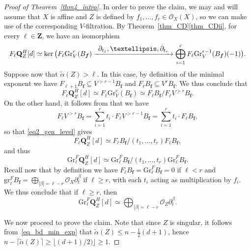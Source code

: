 \documentclass[11pt]{article}
\numberwithin{equation}{section}
\newcommand{\To}[1]{\mathchoice{\xrightarrow{\textstyle\kern4pt#1\kern3pt}}{\stackrel{#1}{\longrightarrow}}{}{}}
\theoremstyle{plain}
\theoremstyle{definition}
\newcommand\Z{{\mathbf Z}}
\newcommand\Q{{\mathbf Q}}
\newcommand\cO{\mathcal{O}}
\newcommand\cO{\mathcal{O}}
\newcommand\bff{{\boldsymbol f}}
\newcommand\gr{\mathrm{Gr}}
\begin{document}
\begin{proof}[Proof of Theorem~\ref{thm4_intro}]
In order to prove the claim, we may and will assume that $X$ is affine and $Z$ is defined by $f_1,\ldots,f_r\in\cO_X(X)$, so we can make use
of the corresponding $V$-filtration. By Theorem~\ref{thm_CD}\eqref{thm_CDii}, for every $\ell\in\Z$, we have an isomorphism\vspace*{-3pt}
\[F_{\ell}\Q^H_Z[d]\simeq \ker\big(F_{\ell}\gr_V^r(B_{\bff})\To{\partial_{t_1},\ldots,\partial_{t_r}}
\bigoplus_{i=1}^rF_{\ell}\gr_V^{r-1}(B_{\bff})(-1)\big).\]
Suppose now that $\widetilde{\alpha}(Z)>\ell$. In this case, by definition of the minimal exponent we have
$F_{\ell+1}B_{\bff}\subseteq V^{>r-1}B_{\bff}$ and $F_{\ell}B_{\bff}
\subseteq V^rB_{\bff}$. We thus conclude that\vspace*{-3pt}
\begin{equation}\label{eq2_gen_level}
F_{\ell}\Q^H_Z[d]\simeq F_{\ell}\gr_V^r(B_{\bff})\simeq F_{\ell}B_{\bff}/F_{\ell}V^{>r}B_{\bff}.
\end{equation}
On the other hand, it follows from \cite[Th.\,1.1]{CD} that we have\vspace*{-3pt}
\[F_{\ell}V^{>r}B_{\bff}=\sum_{i=1}^rt_i\cdot F_{\ell}V^{>r-1}B_{\bff}=\sum_{i=1}^rt_i\cdot F_{\ell}B_{\bff},\]
so that \eqref{eq2_gen_level} gives\vspace*{-3pt}
\[F_{\ell}\Q^H_Z[d]\simeq F_{\ell}B_{\bff}/(t_1,\ldots,t_r)F_{\ell}B_{\bff},\]
and thus\vspace*{-3pt}
\[\gr_{\ell}^F\Q_Z^H[d]\simeq \gr^F_{\ell}B_{\bff}/(t_1,\ldots,t_r)\gr^F_{\ell}B_{\bff}.\]
Recall now that by definition we have
$F_\ell B_\bff = \gr^F_\ell B_\bff = 0$ if $\ell < r$ and $\mathrm{gr}^F_{\ell}B_{\bff}=\bigoplus_{|\beta| = \ell -r}\cO_X\partial_t^{\beta}$ if $\ell\geq r$,
with each $t_i$ acting as multiplication by $f_i$. We thus conclude that if $\ell\geq r$, then\vspace*{-3pt}
\begin{equation}\label{eq3_gen_level}
\gr_{\ell}^F\Q_Z^H[d]\simeq\bigoplus_{|\beta| = \ell -r}\cO_Z\partial_t^{\beta}.
\end{equation}

We now proceed to prove the claim. Note that since $Z$ is singular, it follows from~\eqref{eq_bd_min_exp} that
$\widetilde{\alpha}(Z)\leq n-\tfrac{1}{2}(d+1)$, hence $n-\lceil \widetilde{\alpha}(Z)\rceil\geq\lfloor (d+1)/2)\rfloor\geq 1$.


\end{proof}
\end{document}
